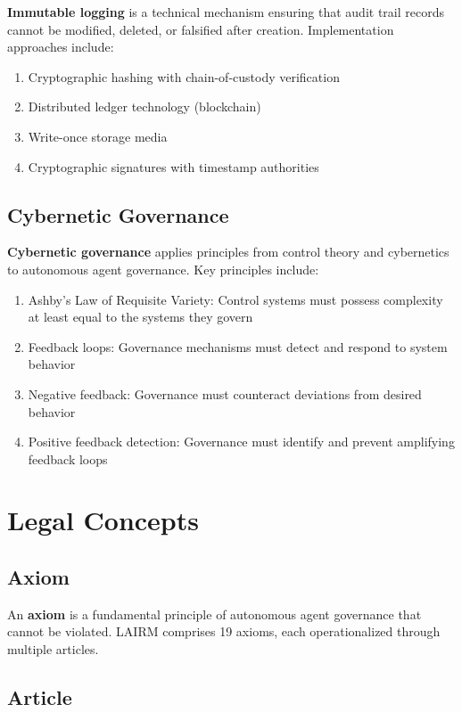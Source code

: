 \documentclass[12pt,a4paper,twoside,openright]{book}
\begin{document}
\textbf{Immutable logging} is a technical mechanism ensuring that audit trail records cannot be modified, deleted, or falsified after creation. Implementation approaches include:
\begin{enumerate}
    \item Cryptographic hashing with chain-of-custody verification
    \item Distributed ledger technology (blockchain)
    \item Write-once storage media
    \item Cryptographic signatures with timestamp authorities
\end{enumerate}

\subsection{Cybernetic Governance}

\textbf{Cybernetic governance} applies principles from control theory and cybernetics to autonomous agent governance. Key principles include:
\begin{enumerate}
    \item Ashby's Law of Requisite Variety: Control systems must possess complexity at least equal to the systems they govern
    \item Feedback loops: Governance mechanisms must detect and respond to system behavior
    \item Negative feedback: Governance must counteract deviations from desired behavior
    \item Positive feedback detection: Governance must identify and prevent amplifying feedback loops
\end{enumerate}

\section{Legal Concepts}

\subsection{Axiom}

An \textbf{axiom} is a fundamental principle of autonomous agent governance that cannot be violated. LAIRM comprises 19 axioms, each operationalized through multiple articles.

\subsection{Article}
\end{document}
